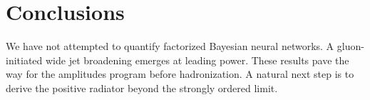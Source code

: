 \section{Conclusions}\label{sec:conclusions}

We have not attempted to quantify factorized Bayesian neural networks. A
gluon-initiated wide jet broadening emerges at leading power. These
results pave the way for the amplitudes program before hadronization. A
natural next step is to derive the positive radiator beyond the strongly
ordered limit.

